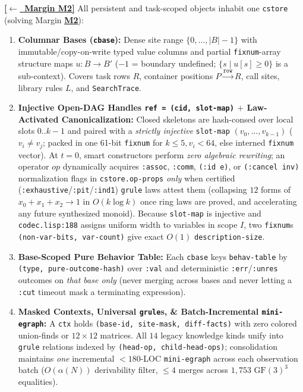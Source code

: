 \documentclass[12pt]{article}
\newcommand{\ansback}[2]{\hyperlink{#1}{\textcolor{qpurple}{\textbf{\small[\(\leftarrow\)~#2]}}}}
\begin{document}
\ansback{q:m2}{Margin M2}
All persistent and task-scoped objects inhabit one \texttt{cstore} (solving Margin \hyperlink{q:m2}{\textbf{M2}}):
\begin{enumerate}[leftmargin=1.6em, itemsep=0.2em]
  \item \textbf{Columnar Bases (\texttt{cbase}):} Dense site range $\{0,\dots,|B|-1\}$ with immutable/copy-on-write typed value columns and partial \texttt{fixnum}-array structure maps $u : B \to B'$ ($-1$ = boundary undefined; $\{s \mid u[s]\ge 0\}$ is a sub-context). Covers task rows $R$, container positions $P \xrightarrow{\texttt{row}} R$, call sites, library rules $L$, and \texttt{SearchTrace}.
  \item \textbf{Injective Open-DAG Handles \texttt{ref = (cid, slot-map)} $+$ Law-Activated Canonicalization:} Closed skeletons are hash-consed over local slots $0..k-1$ and paired with a \emph{strictly injective} \texttt{slot-map} $(v_0,\dots,v_{k-1})$ ($v_i \ne v_j$; packed in one 61-bit \texttt{fixnum} for $k \le 5, v_i < 64$, else interned \texttt{fixnum} vector). At $t=0$, smart constructors perform \emph{zero algebraic rewriting}; an operator $op$ dynamically acquires \texttt{:assoc}, \texttt{:comm}, \texttt{(:id e)}, or \texttt{(:cancel inv)} normalization flags in \texttt{cstore.op-props} \emph{only} when certified (\texttt{:exhaustive}/\texttt{:pit}/\texttt{:ind1}) \texttt{grule} laws attest them (collapsing $12$ forms of $x_0+x_1+x_2 \to 1$ in $O(k\log k)$ once ring laws are proved, and accelerating any future synthesized monoid). Because \texttt{slot-map} is injective and \texttt{codec.lisp:188} assigns uniform width to variables in scope $I$, two \texttt{fixnum}s \texttt{(non-var-bits, var-count)} give exact $O(1)$ \texttt{description-size}.
  \item \textbf{Base-Scoped Pure Behavior Table:} Each \texttt{cbase} keys \texttt{behav-table} by \texttt{(type, pure-outcome-hash)} over \texttt{:val} and deterministic \texttt{:err}/\texttt{:unres} outcomes on \emph{that base only} (never merging across bases and never letting a \texttt{:cut} timeout mask a terminating expression).
  \item \textbf{Masked Contexts, Universal \texttt{grule}s, \& Batch-Incremental \texttt{mini-egraph}:} A \texttt{ctx} holds \texttt{(base-id, site-mask, diff-facts)} with zero colored union-finds or $12\times 12$ matrices. All $14$ legacy knowledge kinds unify into \texttt{grule} relations indexed by \texttt{(head-op, child-head-ops)}; consolidation maintains \emph{one} incremental $<180$-LOC \texttt{mini-egraph} across each observation batch ($O(\alpha(N))$ derivability filter, $\le 4$ merges across $1,753$ $\mathrm{GF}(3)^3$ equalities).
\end{enumerate}
\end{document}
